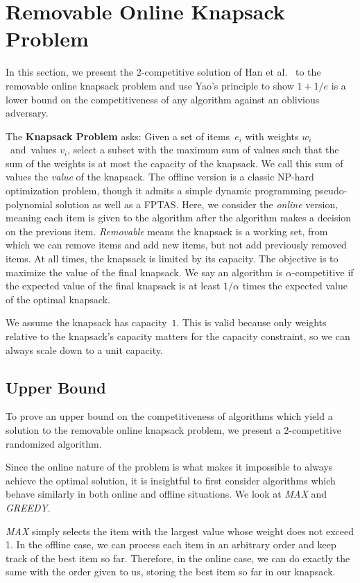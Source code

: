 \section{Removable Online Knapsack Problem}
In this section, we present the 2-competitive solution of Han et al.~\cite{han} to the removable online knapsack problem and use Yao's principle to show $1+1/e$ is a lower bound on the competitiveness of any algorithm against an oblivious adversary.

The \textbf{Knapsack Problem} asks: Given a set of items~$e_i$ with weights $w_i$~and~values $v_i$, select a subset with the maximum sum of values such that the sum of the weights is at most the capacity of the knapsack. We call this sum of values the \emph{value} of the knapsack. The offline version is a classic NP-hard optimization problem, though it admits a simple dynamic programming pseudo-polynomial solution as well as a FPTAS. Here, we consider the \emph{online} version, meaning each item is given to the algorithm after the algorithm makes a decision on the previous item. \emph{Removable} means the knapsack is a working set, from which we can remove items and add new items, but not add previously removed items. At all times, the knapsack is limited by its capacity. The objective is to maximize the value of the final knapsack. We say an algorithm is $\alpha$-competitive if the expected value of the final knapsack is at least $1/\alpha$ times the expected value of the optimal knapsack.

We assume the knapsack has capacity~$1$. This is valid because only weights relative to the knapsack's capacity matters for the capacity constraint, so we can always scale down to a unit capacity.

\subsection{Upper Bound} %
To prove an upper bound on the competitiveness of algorithms which yield a solution to the removable online knapsack problem, we present a 2-competitive randomized algorithm.

Since the online nature of the problem is what makes it impossible to always achieve the optimal solution, it is insightful to first consider algorithms which behave similarly in both online and offline situations. We look at \emph{MAX} and \emph{GREEDY}.

\emph{MAX} simply selects the item with the largest value whose weight does not exceed 1. In the offline case, we can process each item in an arbitrary order and keep track of the best item so far. Therefore, in the online case, we can do exactly the same with the order given to us, storing the best item so far in our knapsack.


